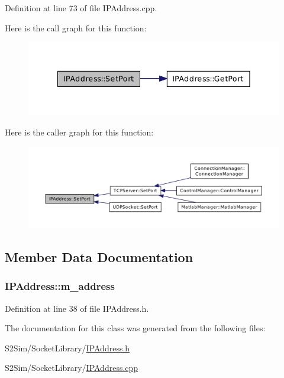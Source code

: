 Definition at line 73 of file I\-P\-Address.\-cpp.



Here is the call graph for this function\-:\nopagebreak
\begin{figure}[H]
\begin{center}
\leavevmode
\includegraphics[width=342pt]{class_i_p_address_a5908d6242879f0e45685f8b0734dafa7_cgraph}
\end{center}
\end{figure}




Here is the caller graph for this function\-:\nopagebreak
\begin{figure}[H]
\begin{center}
\leavevmode
\includegraphics[width=350pt]{class_i_p_address_a5908d6242879f0e45685f8b0734dafa7_icgraph}
\end{center}
\end{figure}




\subsection{Member Data Documentation}
\hypertarget{class_i_p_address_aaafe20f26b2569a5ac9cd3b61b5c0c50}{
\subsubsection[{m\-\_\-address}]{ I\-P\-Address\-::m\-\_\-address\hspace{0.3cm}{\ttfamily [private]}}}\label{class_i_p_address_aaafe20f26b2569a5ac9cd3b61b5c0c50}


Definition at line 38 of file I\-P\-Address.\-h.



The documentation for this class was generated from the following files\-:\begin{DoxyCompactItemize}
\item 
S2\-Sim/\-Socket\-Library/\hyperlink{_i_p_address_8h}{I\-P\-Address.\-h}\item 
S2\-Sim/\-Socket\-Library/\hyperlink{_i_p_address_8cpp}{I\-P\-Address.\-cpp}\end{DoxyCompactItemize}

